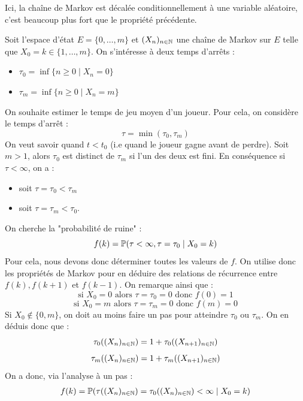 \begin{remark}
    Ici, la chaîne de Markov est décalée conditionnellement à une variable aléatoire, c'est beaucoup plus fort 
    que le propriété précédente. 
\end{remark}

\begin{example}
    Soit l'espace d'état $E = \{ 0, \dots, m \}$ et $(X_n)_{n \in \mathbb{N}}$ une chaîne de Markov sur $E$ 
    telle que $X_0 = k \in \{ 1, \dots, m \}$. On s'intéresse à deux temps d'arrêts : 
    \begin{itemize}
        \item $ \tau_0 = \inf \{ n \geqslant 0 \; | \; X_n = 0 \} $ 
        \item $  \tau_m = \inf \{ n \geqslant 0 \; | \; X_n = m \}$ 
    \end{itemize} 
    On souhaite estimer le temps de jeu moyen d'un joueur. Pour cela, on considère le temps d'arrêt : 
        $$ \tau = \min ( \tau_0, \tau_m) $$ 
    On veut savoir quand $t < t_0$ (i.e quand le joueur gagne avant de perdre). 
    Soit $ m> 1$, alors $ \tau_0$ est distinct de $ \tau_m$ si l'un des deux est fini. En conséquence 
    si $ \tau < \infty$, on a : 
    \begin{itemize}
        \item soit $ \tau = \tau_0 < \tau_m$ 
        \item soit $ \tau = \tau_m < \tau_0$. 
    \end{itemize}
    On cherche la "probabilité de ruine" : 
        $$ f(k) = \mathbb{P}( \tau < \infty, \tau = \tau_0 \; | \; X_0 = k) $$ 
    Pour cela, nous devons donc déterminer toutes les valeurs de $f$. On utilise donc les propriétés de Markov pour en déduire 
    des relations de récurrence entre $f(k), f(k+1)$ et $f(k-1)$. On remarque ainsi que : 
        $$ \text{si } X_0 = 0 \text{ alors } \tau = \tau_0 = 0 \text{ donc } f(0) = 1 $$ 
        $$ \text{si } X_0 = m \text{ alors } \tau = \tau_m = 0 \text{ donc } f(m) = 0 $$
    Si $X_0 \not \in \{ 0, m \} $, on doit au moins faire un pas pour atteindre $ \tau_0$ ou $ \tau_m$. On en déduis donc que : 
        $$ \tau_0((X_n)_{n \in \mathbb{N}}) = 1 + \tau_0((X_{n+1})_{n \in \mathbb{N}}) $$ 
        $$ \tau_m((X_n)_{n \in \mathbb{N}}) = 1 + \tau_m((X_{n+1})_{n \in \mathbb{N}}) $$ 
    On a donc, via l'analyse à un pas : 
        \begin{align*}
            f(k) &= \myP( \tau((X_n)_{n \in \N}) = \tau_0((X_n)_{n \in \N}) < \infty \; | \; X_0 = k) \\

\end{align*}
\end{example}

